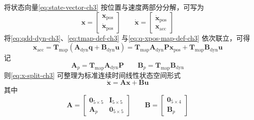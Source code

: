将状态向量\eqref{eq:state-vector-ch3} 按位置与速度两部分分解，可写为
\begin{equation}
  \boldsymbol{x}
  =
  \begin{bmatrix}
    \boldsymbol{x}_{\mathrm{pos}} \\
    \dot{\boldsymbol{x}}_{\mathrm{pos}}
  \end{bmatrix}
  \qquad
  \dot{\boldsymbol{x}}
  =
  \begin{bmatrix}
    \dot{\boldsymbol{x}}_{\mathrm{pos}} \\
    \boldsymbol{x}_{\mathrm{acc}}
  \end{bmatrix}
  \label{eq:x-split-ch3}
\end{equation}
将\eqref{eq:qdd-dyn-ch3}、\eqref{eq:tmap-def-ch3} 与\eqref{eq:q-xpos-map-def-ch3} 依次联立，可得
\begin{equation}
  \boldsymbol{x}_{\mathrm{acc}}
  =
  \boldsymbol{T}_{\mathrm{map}}
  \left(
    \boldsymbol{A}_{\mathrm{dyn}}\boldsymbol{q}
    +
    \boldsymbol{B}_{\mathrm{dyn}}\boldsymbol{u}
  \right)
  =
  \boldsymbol{T}_{\mathrm{map}}\boldsymbol{A}_{\mathrm{dyn}}\boldsymbol{P}\boldsymbol{x}_{\mathrm{pos}}
  +
  \boldsymbol{T}_{\mathrm{map}}\boldsymbol{B}_{\mathrm{dyn}}\boldsymbol{u}
  \label{eq:xacc-from-qdd-ch3}
\end{equation}
记
\begin{equation}
  \boldsymbol{A}_p = \boldsymbol{T}_{\mathrm{map}}\boldsymbol{A}_{\mathrm{dyn}}\boldsymbol{P}
  \qquad
  \boldsymbol{B}_p = \boldsymbol{T}_{\mathrm{map}}\boldsymbol{B}_{\mathrm{dyn}}
  \label{eq:ap-bp-ch3}
\end{equation}
则\eqref{eq:x-split-ch3} 可整理为标准连续时间线性状态空间形式
\begin{equation}
  \dot{\boldsymbol{x}}
  =
  \boldsymbol{A}\boldsymbol{x}
  +
  \boldsymbol{B}\boldsymbol{u}
  \label{eq:linear-state-space-ch3}
\end{equation}
其中
\begin{equation}
  \boldsymbol{A}
  =
  \begin{bmatrix}
    \boldsymbol{0}_{5\times5} & \boldsymbol{I}_{5\times5} \\
    \boldsymbol{A}_p & \boldsymbol{0}_{5\times5}
  \end{bmatrix}
  \qquad
  \boldsymbol{B}
  =
  \begin{bmatrix}
    \boldsymbol{0}_{5\times4} \\
    \boldsymbol{B}_p
  \end{bmatrix}
  \label{eq:ab-matrix-ch3}
\end{equation}

